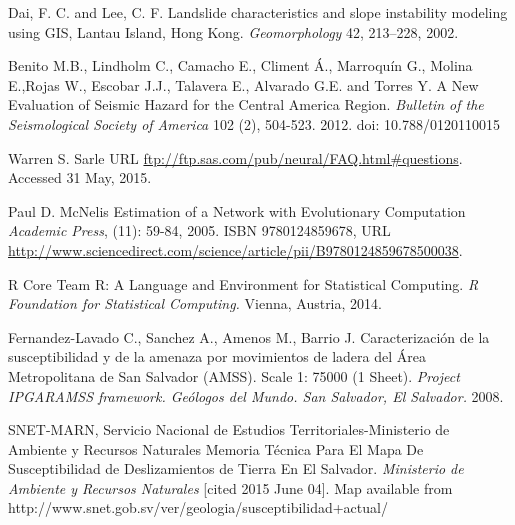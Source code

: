 \documentclass[11pt,twoside]{rmta2010esp}%
\begin{document}
\begin{thebibliography}{99}
Dai, F. C. and Lee, C. F.
\newblock Landslide characteristics and slope instability modeling using GIS, Lantau Island, Hong Kong.
\newblock \emph{Geomorphology}
 42, 213–228, 2002.



Benito M.B., Lindholm C., Camacho E., Climent Á., Marroquín G., Molina E.,Rojas W., Escobar J.J., Talavera E., Alvarado G.E. and Torres Y.
\newblock A New Evaluation of Seismic Hazard for the Central America Region. 
\newblock \emph{Bulletin of the Seismological Society of America}
 102 (2), 504-523. 2012.
\newblock  doi: 10.788/0120110015









Warren S. Sarle
\newblock URL
  \url{ftp://ftp.sas.com/pub/neural/FAQ.html#questions}.
  \newblock Accessed 31 May, 2015.



Paul D. McNelis
\newblock Estimation of a Network with Evolutionary Computation
\newblock \emph{Academic Press},
  (11): 59-84, 2005.
\newblock ISBN 9780124859678,
\newblock URL
  \url{http://www.sciencedirect.com/science/article/pii/B9780124859678500038}.


R Core Team
\newblock R: A Language and Environment for Statistical Computing.
\newblock \emph{R Foundation for Statistical Computing.}
 Vienna, Austria, 2014.




Fernandez-Lavado C., Sanchez A., Amenos M., Barrio J.
\newblock Caracterización de la susceptibilidad y de la amenaza por movimientos de ladera del Área Metropolitana de San Salvador (AMSS). Scale 1: 75000 (1 Sheet).
\newblock \emph{Project IPGARAMSS framework. Geólogos del Mundo. San Salvador, El Salvador.}
 2008.




SNET-MARN, Servicio Nacional de Estudios Territoriales-Ministerio de Ambiente y Recursos Naturales
\newblock Memoria Técnica Para El Mapa De Susceptibilidad de Deslizamientos de Tierra En El Salvador.
\newblock \emph{Ministerio de Ambiente y Recursos Naturales}
 [cited 2015 June 04]. Map available from http://www.snet.gob.sv/ver/geologia/susceptibilidad+actual/



\end{thebibliography}
\end{document}

